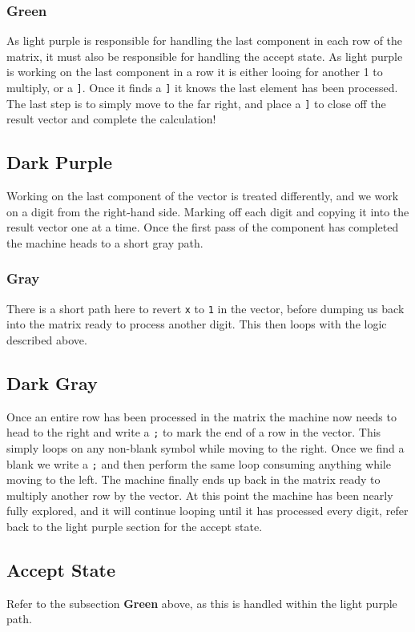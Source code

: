 \documentclass[letterpaper, 11pt]{article}
\begin{document}
\subsubsection{Green}
\label{sec:org6fe4b9a}
As light purple is responsible for handling the last component in each row of the matrix, it must also be responsible for handling the accept state. As light purple is working on the last component in a row it is either looing for another 1 to multiply, or a \texttt{]}. Once it finds a \texttt{]} it knows the last element has been processed. The last step is to simply move to the far right, and place a \texttt{]} to close off the result vector and complete the calculation!\\
\subsection{Dark Purple}
\label{sec:orga596dab}
Working on the last component of the vector is treated differently, and we work on a digit from the right-hand side. Marking off each digit and copying it into the result vector one at a time. Once the first pass of the component has completed the machine heads to a short gray path.\\
\subsubsection{Gray}
\label{sec:orgecb21d4}
There is a short path here to revert \texttt{x} to \texttt{1} in the vector, before dumping us back into the matrix ready to process another digit. This then loops with the logic described above.\\
\subsection{Dark Gray}
\label{sec:orgadbacfe}
Once an entire row has been processed in the matrix the machine now needs to head to the right and write a \texttt{;} to mark the end of a row in the vector. This simply loops on any non-blank symbol while moving to the right. Once we find a blank we write a \texttt{;} and then perform the same loop consuming anything while moving to the left. The machine finally ends up back in the matrix ready to multiply another row by the vector. At this point the machine has been nearly fully explored, and it will continue looping until it has processed every digit, refer back to the light purple section for the accept state.\\
\subsection{Accept State}
\label{sec:org1a0f7ff}
Refer to the subsection \textbf{Green} above, as this is handled within the light purple path.\\
\end{document}
